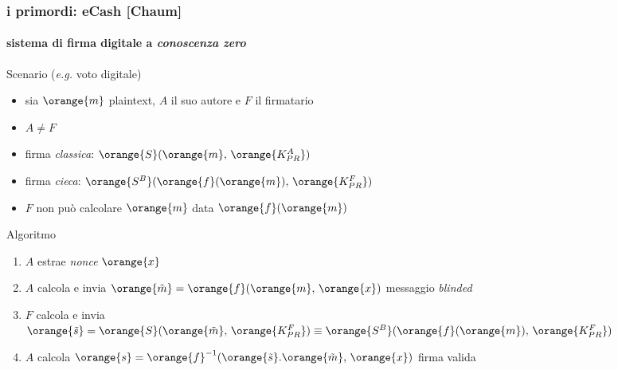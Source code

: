 \begin{frame}
	\frametitle{i primordi: eCash [Chaum]}
	\framesubtitle{sistema di firma digitale a \textit{conoscenza zero}}
	
	Scenario (\textit{e.g.} voto digitale)
	\begin{itemize}
	  \item sia $\orange{m}$ plaintext, $A$ il suo autore e $F$ il firmatario 
	  \item $A\neq F$
	  \item firma \textit{classica}: $\orange{S}(\orange{m},\,\orange{K_{PR}^A})$
	  \item firma \textit{{\color{blue}cieca}}: $\orange{S^B}(\orange{f}(\orange{m}),\,\orange{K_{PR}^F})$ 
	  \item $F$ non può calcolare $\orange{m}$ data $\orange{f}(\orange{m})$  
	\end{itemize}
	Algoritmo
	\begin{enumerate}
	  \item $A$ estrae \textit{nonce} $\orange{x}$
	  \item $A$ calcola e invia $\orange{\tilde{m}}=\orange{f}(\orange{m},\,\orange{x})$ messaggio \textit{blinded} 
	  \item $F$ calcola e invia $\orange{\tilde{s}}=\orange{S}(\orange{\tilde{m}},\,\orange{K_{PR}^F}) 
	  		\equiv \orange{S^B}(\orange{f}(\orange{m}),\,\orange{K_{PR}^F})$
	  \item $A$ calcola $\orange{s}=\orange{f}^{-1}(\orange{\tilde{s}}.\orange{\tilde{m}},\,\orange{x})$ firma valida
	\end{enumerate}

\end{frame}

